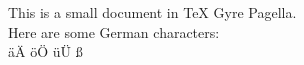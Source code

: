 \documentclass{article}
\begin{document}
This is a small document in TeX Gyre Pagella.
\\
Here are some German characters:
\\
äÄ öÖ üÜ ß
\end{document}
